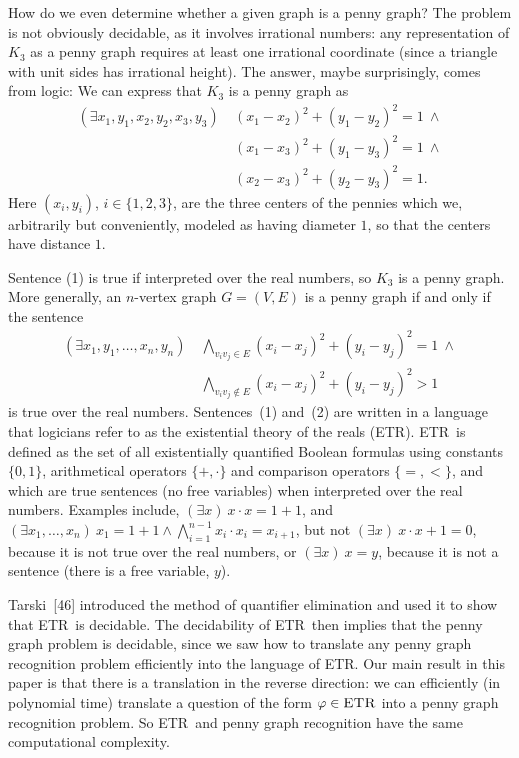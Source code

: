 \documentclass{article}
\begin{document}
How do we even determine whether a given graph is a penny graph? The problem is not obviously decidable, as it involves irrational numbers: any representation of $K_3$ as a penny graph requires at least one irrational coordinate (since a triangle with unit sides has irrational height). The answer, maybe surprisingly, comes from logic: We can express that $K_3$ is a penny graph as
\begin{equation}\tag{1}
\begin{split}
(\exists x_1,y_1,x_2,y_2,x_3,y_3)\ & (x_1-x_2)^2+(y_1-y_2)^2 = 1\ \wedge \\
 & (x_1-x_3)^2+(y_1-y_3)^2 = 1\ \wedge \\
 & (x_2-x_3)^2+(y_2-y_3)^2 = 1. 
\end{split}
\end{equation}
Here $(x_i,y_i)$, $i \in \{1,2,3\}$, are the three centers of the pennies which we, arbitrarily but conveniently, modeled as having diameter $1$, so that the centers have distance $1$. 

Sentence (1) is true if interpreted over the real numbers, so $K_3$ is a penny graph. More generally, an $n$-vertex graph $G = (V,E)$ is a penny graph if and only if the sentence
\begin{equation}\tag{2}
\begin{split}
(\exists x_1, y_1, \ldots, x_n, y_n)\ & \bigwedge_{v_iv_j \in E} (x_i-x_j)^2+(y_i-y_j)^2 = 1\ \wedge \\
 & \bigwedge_{v_iv_j \notin E} (x_i-x_j)^2+(y_i-y_j)^2 > 1
\end{split}
\end{equation}
is true over the real numbers. Sentences~(1) and~(2) are written in a language that logicians
refer to as the existential theory of the reals (\textnormal{\textsc{ETR}}). \textnormal{\textsc{ETR}}\ is defined as the set of all existentially quantified Boolean formulas
using constants $\{0,1\}$, arithmetical operators $\{+,\cdot\}$ and comparison operators $\{=, <\}$, and which are true sentences (no free variables) when interpreted over the real numbers. Examples include, $(\exists x)\ x\cdot x = 1+1$, and  $(\exists x_1, \ldots, x_n)\ x_1 = 1 + 1 \wedge \bigwedge_{i=1}^{n-1} x_i\cdot x_i = x_{i+1}$, but not 
$(\exists x)\ x\cdot x +1 = 0$, because it is not true over the real numbers, or $(\exists x)\ x = y$, because it is not a sentence (there is a free variable, $y$).

Tarski~[46] introduced the method of quantifier elimination and used it to show that \textnormal{\textsc{ETR}}\ is decidable. The decidability of \textnormal{\textsc{ETR}}\ then implies that the penny graph problem is decidable, since we saw how to translate any penny graph recognition problem efficiently into the language of \textnormal{\textsc{ETR}}. Our main result in this paper is that there is a translation in the reverse direction: we can efficiently (in polynomial time) translate a question of the form $\varphi \in \textnormal{\textsc{ETR}}$ into a penny graph recognition problem. So \textnormal{\textsc{ETR}}\ and penny graph recognition have the same computational complexity.
\end{document}
